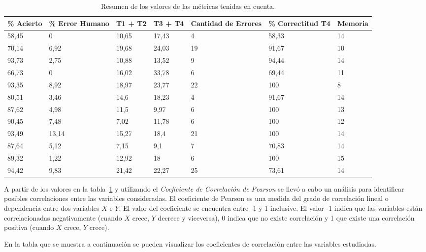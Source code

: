 \begin{table}[H]
\centering
\footnotesize
\begin{tabular}{|p{1.6cm}|p{1.6cm}|p{1.6cm}|p{1.6cm}|p{1.6cm}|p{1.6cm}|p{1.6cm}|}
\hline
    \% Acierto & \% Error Humano & T1 + T2 & T3 + T4 & Cantidad de Errores & \% Correctitud T4 & Memoria \\
    \hline 
    58,45 & 0 & 10,65 & 17,43 & 4 & 58,33 & 14 \\
    70,14 & 6,92 & 19,68 & 24,03 & 19 & 91,67 & 10 \\
    93,73 & 2,75 & 10,88 & 13,52 & 9 & 94,44 & 14 \\
    66,73 & 0 & 16,02 & 33,78 & 6 & 69,44 & 11 \\
    93,35 & 8,92 & 18,97 & 23,77 & 22 & 100 & 8 \\
    80,51 & 3,46 & 14,6 & 18,23 & 4 & 91,67 & 14 \\
    87,62 & 4,98  &  11,5 & 9,97 & 6 & 100 & 13 \\
    90,45 & 7,48 & 7,02 & 11,78 & 6 & 100 & 12 \\
    93,49 & 13,14 & 15,27 & 18,4 & 21 & 100 & 14 \\
    87,64 & 5,12 & 7,15 & 9,1 & 7 & 70,83 & 14 \\
    89,32 & 1,22 & 12,92 & 18 & 6 & 100 & 15 \\
    94,42 & 9,83 & 21,42 & 22,27 & 25 & 73,61 & 14 \\
\hline
\end{tabular}
\caption{Resumen de los valores de las métricas tenidas en cuenta.}
\label{sec:tabla-resumen-experimento}
\end{table}

A partir de los valores en la tabla~\ref{sec:tabla-resumen-experimento} y utilizando el \emph{Coeficiente de 
Correlaci\'on de Pearson}\cite{BoslaughStatistics2008} se llev\'o a cabo un an\'alisis  para identificar posibles
correlaciones entre las variables consideradas. El coeficiente de Pearson es una medida del grado de 
correlaci\'on lineal o dependencia entre dos variables $X$ e $Y$. El valor del coeficiente se encuentra entre
-1 y 1 inclusive. El valor -1 indica que las variables est\'an correlacionadas negativamente 
(cuando $X$ crece, $Y$ decrece y viceversa), 0 indica que no existe correlaci\'on y 1 que existe una correlaci\'on
positiva (cuando $X$ crece, $Y$ crece).

\newpage
En la tabla que se muestra a continuaci\'on se pueden visualizar los coeficientes de correlaci\'on entre las variables estudiadas.

